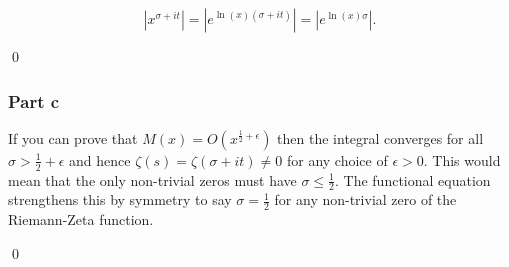 \documentclass{unswmaths}
\begin{document}
$$ |x^{\sigma + it}| = |e^{\ln(x)(\sigma + it)}| = |e^{\ln(x)\sigma}|. $$


\qed
\subsubsection*{Part c}
If you can prove that $ M(x) = O(x^{\frac{1}{2} + \epsilon }) $ then the integral converges for all $ \sigma > \frac{1}{2} + \epsilon $
and hence $ \zeta(s) = \zeta(\sigma + it) \neq 0 $ for any choice of $ \epsilon > 0 $. This would mean that the only non-trivial zeros
must have $ \sigma \leq \frac{1}{2} $. The functional equation strengthens this by symmetry to say $ \sigma = \frac{1}{2} $ for any non-trivial
zero of the Riemann-Zeta function.

\qed
\end{document}
